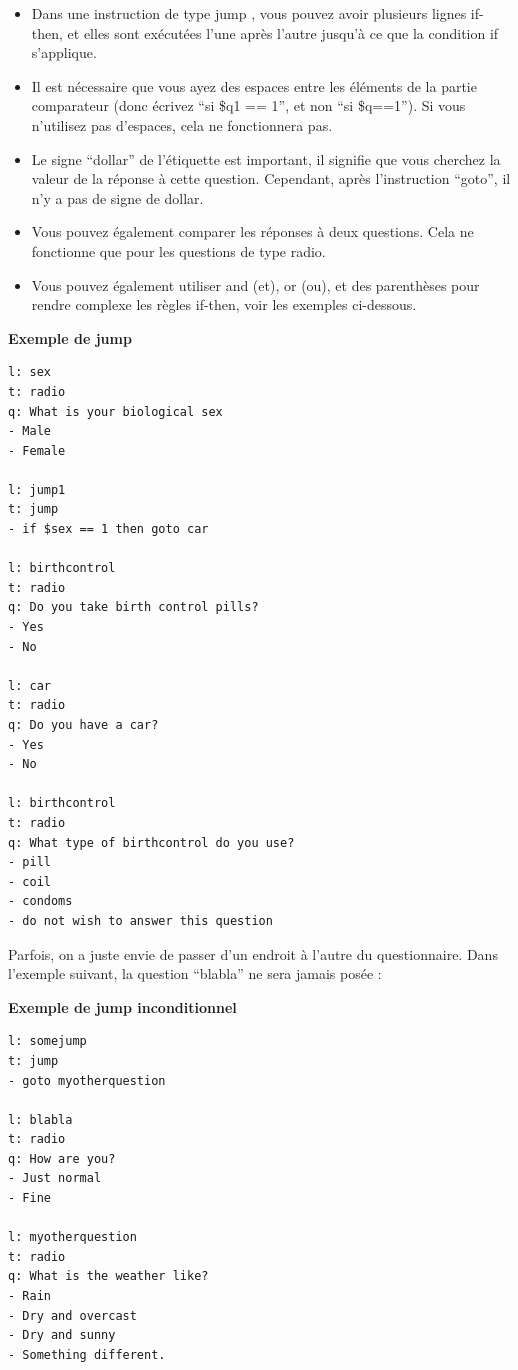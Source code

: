 \documentclass[
]{book}
\providecommand{\tightlist}{%
  \setlength{\itemsep}{0pt}\setlength{\parskip}{0pt}}
\begin{document}
\begin{itemize}
\tightlist
\item
  Dans une instruction de type jump , vous pouvez avoir plusieurs lignes if-then, et elles sont exécutées l'une après l'autre jusqu'à ce que la condition if s'applique.
\item
  Il est nécessaire que vous ayez des espaces entre les éléments de la partie comparateur (donc écrivez ``si \$q1 == 1'', et non ``si \$q==1''). Si vous n'utilisez pas d'espaces, cela ne fonctionnera pas.
\item
  Le signe ``dollar'' de l'étiquette est important, il signifie que vous cherchez la valeur de la réponse à cette question. Cependant, après l'instruction ``goto'', il n'y a pas de signe de dollar.
\item
  Vous pouvez également comparer les réponses à deux questions. Cela ne fonctionne que pour les questions de type radio.
\item
  Vous pouvez également utiliser and (et), or (ou), et des parenthèses pour rendre complexe les règles if-then, voir les exemples ci-dessous.
\end{itemize}

\textbf{Exemple de jump}

\begin{verbatim}
l: sex
t: radio
q: What is your biological sex
- Male
- Female

l: jump1
t: jump
- if $sex == 1 then goto car

l: birthcontrol
t: radio
q: Do you take birth control pills?
- Yes
- No

l: car
t: radio
q: Do you have a car?
- Yes
- No

l: birthcontrol
t: radio
q: What type of birthcontrol do you use?
- pill
- coil
- condoms
- do not wish to answer this question
\end{verbatim}

Parfois, on a juste envie de passer d'un endroit à l'autre du questionnaire. Dans l'exemple suivant, la question ``blabla'' ne sera jamais posée :

\textbf{Exemple de jump inconditionnel}

\begin{verbatim}
l: somejump
t: jump
- goto myotherquestion

l: blabla
t: radio
q: How are you?
- Just normal
- Fine

l: myotherquestion
t: radio
q: What is the weather like?
- Rain
- Dry and overcast
- Dry and sunny
- Something different.
\end{verbatim}
\end{document}
